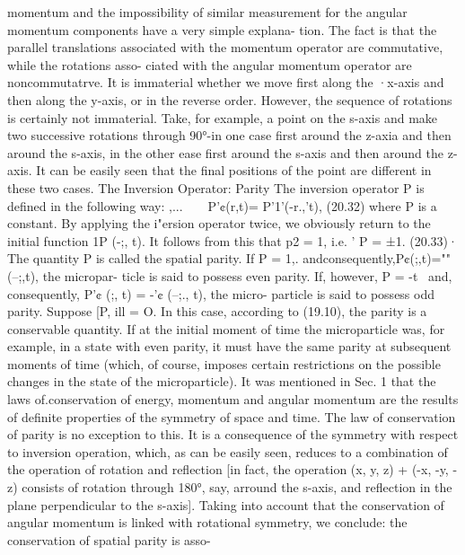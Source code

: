 \documentclass[a4paper,sfsidenotes,colorlinks=true]{tufte-book}
\numberwithin{equation}{section}
\numberwithin{figure}{section}
\begin{document}
{{    momentum and the impossibility of similar measurement for the
    angular momentum components have a very simple explana- tion. The
    fact is that the parallel translations associated with the
    momentum operator are commutative, while the rotations asso-
    ciated with the angular momentum operator are noncommutatrve. It
    is immaterial whether we move first along the ·x-axis and then
    along the y-axis, or in the reverse order.  However, the sequence
    of rotations is certainly not immaterial. Take, for example, a
    point on the s-axis and make two successive rotations through
    90°-in one case first around the z-axia and then around the
    s-axis, in the other ease first around the s-axis and then around
    the z-axis. It can be easily seen that the final positions of the
    point are different in these two cases.  The Inversion Operator:
    Parity The inversion operator P is defined in the following way:
    ,... ~ ~ P'¢(r,t)= P'1'(-r.,'t), (20.32) where P is a constant. By
    applying the i"ersion operator twice, we obviously return to the
    initial function 1P (-;, t).  It follows from this that p2 = 1,
    i.e. ' P = ±1. (20.33)· The quantity P is called the spatial
    parity. If P = 1,.  andconsequently,P¢(;,t)=""(--;,t), the
    micropar- ticle is said to possess even parity. If, however, P =
    -t~ and, consequently, P'¢ (;, t) = -'¢ (--;., t), the micro-
    particle is said to possess odd parity.  Suppose [P, ill = O. In
    this case, according to (19.10), the parity is a conservable
    quantity. If at the initial moment of time the microparticle was,
    for example, in a state with even parity, it must have the same
    parity at subsequent moments of time (which, of course, imposes
    certain restrictions on the possible changes in the state of the
    microparticle).  It was mentioned in Sec. 1 that the laws
    of.conservation of energy, momentum and angular momentum are the
    results of definite properties of the symmetry of space and
    time. The law of conservation of parity is no exception to
    this. It is a consequence of the symmetry with respect to
    inversion operation, which, as can be easily seen, reduces to a
    combination of the operation of rotation and reflection [in fact,
    the operation (x, y, z) + (-x, -y, -z) consists of rotation
    through 180°, say, arround the s-axis, and reflection in the plane
    perpendicular to the s-axis]. Taking into account that the
    conservation of angular momentum is linked with rotational
    symmetry, we conclude: the conservation of spatial parity is asso-
}}
\end{document}
